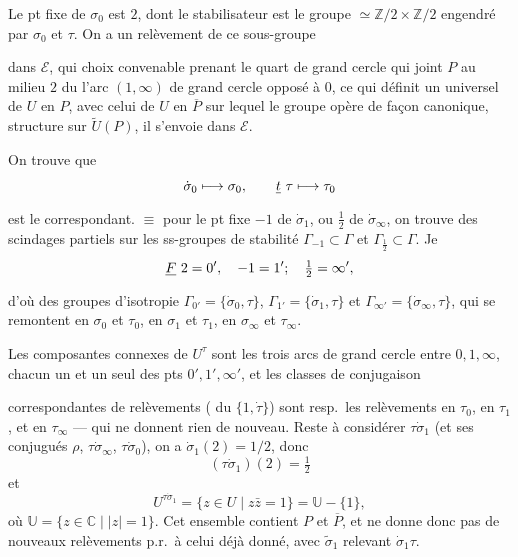 \documentclass[11pt,a4paper]{article}
\begin{document}
Le   pt fixe de $\sigma_0$ est $2$, dont le
stabilisateur est le groupe $\simeq \mathbb{Z}/2 \times \mathbb{Z}/2$
engendré par $\sigma_0$ et $\tau$. On a un relèvement de ce sous-groupe


dans $\mathcal{E}$, qui  choix convenable \ill{} prenant le
quart de grand cercle qui joint $P$ au milieu $2$ du  l'arc
$(1, \infty)$ de grand cercle opposé à $0$, ce qui définit un
 \ill{} \ill{} universel de $U$ en $P$, avec celui
de $U$ en $\overline{P}$ sur lequel le groupe  opère
de façon canonique, \ill{}  \ill{} \ill{} structure sur
$\widetilde{U}(P)$, \ill{} il s'envoie dans $\mathcal{E}$.

On trouve que
\[
\dot\sigma_0 \longmapsto \sigma_0, \qquad \struck{t}\ \tau \longmapsto \tau_0
\]
est le  correspondant.  $\equiv$ pour le
pt fixe $-1$ de $\dot\sigma_1$, ou $\frac12$ de $\dot\sigma_\infty$, on
trouve des scindages partiels sur les ss-groupes de \struck{\ill{}}
stabilité $\Gamma_{-1} \subset \Gamma$ et $\Gamma_{\frac12} \subset
\Gamma$. Je  \ill{} \ill{} \ill{}
\[
\struck{F}\ 2 = 0' , \quad -1 = 1' ; \quad \tfrac12 = \infty' ,
\]
d'où des groupes d'isotropie $\Gamma_{0'} = \{\dot\sigma_0, \tau\}$,
$\Gamma_{1'} = \{\dot\sigma_1, \tau\}$ et $\Gamma_{\infty'} =
\{\dot\sigma_\infty, \tau\}$, qui se remontent  en
$\sigma_0$ et $\tau_0$, \struck{\ill{}} en $\sigma_1$ et $\tau_1$, en
$\sigma_\infty$ et $\tau_\infty$.

Les composantes connexes de $U^{\tau}$ sont les trois arcs de grand cercle
entre $0, 1, \infty$,  
chacun un \struck{\ill{}} et un seul des pts $0', 1', \infty'$, et les
 classes de conjugaison


correspondantes de relèvements ( du $\{1, \dot\tau\}$) sont
resp.\ les relèvements en $\tau_0$, en $\tau_1$, et en $\tau_\infty$ --- qui
ne donnent rien de nouveau. Reste à considérer $\tau\dot\sigma_1$ (et ses
conjugués  $\rho$, $\tau\dot\sigma_\infty$,
$\tau\dot\sigma_0$), on a $\dot\sigma_1(2) = 1/2$, donc
\[
(\tau\dot\sigma_1)(2) = \tfrac12
\]
et
\[
U^{\tau\dot\sigma_1} = \{ z \in U \mid z\bar z = 1 \} = \mathbb{U} - \{1\},
\]
où $\mathbb{U} = \{ z \in \mathbb{C} \mid |z| = 1 \}$. Cet ensemble contient
$P$ et $\overline{P}$, et ne donne donc pas de nouveaux relèvements p.r.\ à
celui déjà donné, avec $\tilde\sigma_1$ relevant $\dot\sigma_1\tau$.
\end{document}
